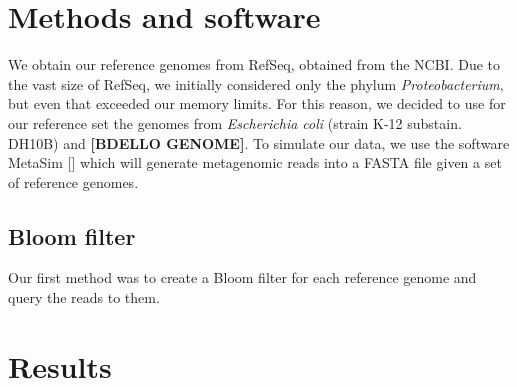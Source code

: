 \documentclass[12pt]{article} %
\begin{document}
\section{Methods and software}
We obtain our reference genomes from RefSeq, obtained from the NCBI. Due to the vast size of RefSeq, we initially considered only the phylum \emph{Proteobacterium}, but even that exceeded our memory limits. For this reason, we decided to use for our reference set the genomes from \emph{Escherichia coli} (strain K-12 substain. DH10B) and  {\bf[BDELLO GENOME]}. To simulate our data, we use the software MetaSim [\cite{Richter:2008dg}] which will generate metagenomic reads into a FASTA file given a set of reference genomes.
\par
\subsection{Bloom filter}
Our first method was to create a Bloom filter for each reference genome and query the reads to them. 
\section{Results}
\end{document}
